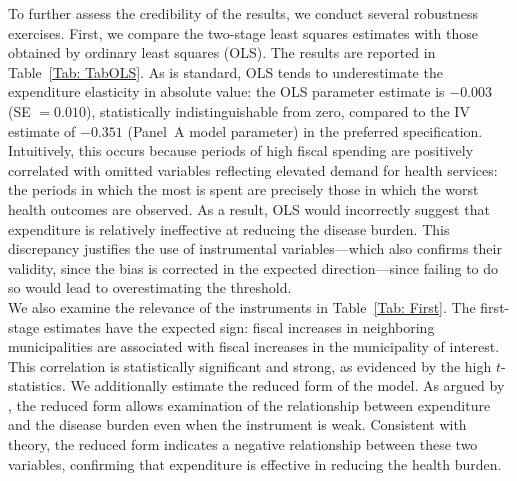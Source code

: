 \documentclass[11pt]{article}
\numberwithin{equation}{section}
\theoremstyle{remark}
\begin{document}
\begin{table}[H]
    \caption{\label{Tab: Oracle} Cost-effectiveness threshold, combining IV estimators}
    \centering
\end{table}


To further assess the credibility of the results, we conduct several robustness exercises. First, we compare the two-stage least squares estimates with those obtained by ordinary least squares (OLS). The results are reported in Table~\ref{Tab: TabOLS}. As is standard, OLS tends to underestimate the expenditure elasticity in absolute value: the OLS parameter estimate is $-0.003$ (SE $= 0.010$), statistically indistinguishable from zero, compared to the IV estimate of $-0.351$ (Panel~A model parameter) in the preferred specification. Intuitively, this occurs because periods of high fiscal spending are positively correlated with omitted variables reflecting elevated demand for health services: the periods in which the most is spent are precisely those in which the worst health outcomes are observed. As a result, OLS would incorrectly suggest that expenditure is relatively ineffective at reducing the disease burden. This discrepancy justifies the use of instrumental variables---which also confirms their validity, since the bias is corrected in the expected direction---since failing to do so would lead to overestimating the threshold.\\

We also examine the relevance of the instruments in Table~\ref{Tab: First}. The first-stage estimates have the expected sign: fiscal increases in neighboring municipalities are associated with fiscal increases in the municipality of interest. This correlation is statistically significant and strong, as evidenced by the high $t$-statistics. We additionally estimate the reduced form of the model. As argued by \citet{Chernozhukov2008}, the reduced form allows examination of the relationship between expenditure and the disease burden even when the instrument is weak. Consistent with theory, the reduced form indicates a negative relationship between these two variables, confirming that expenditure is effective in reducing the health burden.\\
\end{document}
